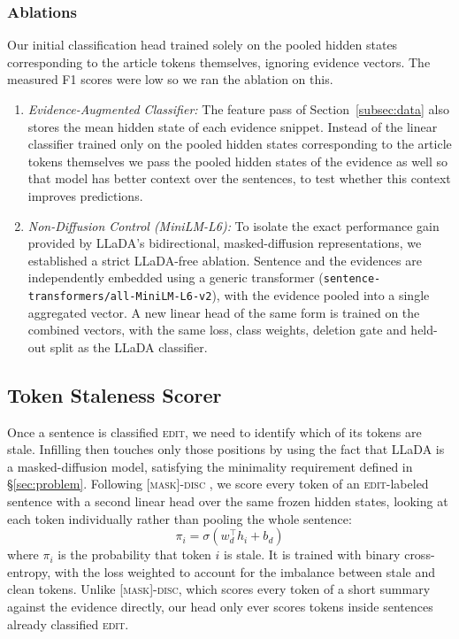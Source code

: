 \documentclass[11pt]{article}
\newcommand{\edit}{\textsc{edit}}
\newcommand{\maskdisc}{\textsc{[mask]-disc}}
\begin{document}
        \subsubsection{Ablations}
            Our initial classification head trained solely on the pooled hidden states corresponding to the article tokens themselves, ignoring evidence vectors. The measured F1 scores were low so we ran the ablation on this.
            \begin{enumerate}
                \item \emph{Evidence-Augmented Classifier:} The feature pass of Section~\ref{subsec:data} also stores the mean hidden state of each evidence snippet. Instead of the linear classifier trained only on the pooled hidden states corresponding to the article tokens themselves we pass the pooled hidden states of the evidence as well so that model has better context over the sentences, to test whether this context improves predictions.

                \item \emph{Non-Diffusion Control (MiniLM-L6):} To isolate the exact performance gain provided by LLaDA's bidirectional, masked-diffusion representations, we established a strict LLaDA-free ablation. Sentence and the evidences are independently embedded using a generic transformer (\texttt{sentence-transformers/\allowbreak all-MiniLM-L6-v2}), with the evidence pooled into a single aggregated vector. A new linear head of the same form is trained on the combined vectors, with the same loss, class weights, deletion gate and held-out split as the LLaDA classifier.
                
            \end{enumerate}

    \subsection{Token Staleness Scorer}
    \label{subsec:staleness}
    
    Once a sentence is classified \edit{}, we need to identify which of its
    tokens are stale. Infilling then touches only those positions by using the fact that LLaDA is a masked-diffusion model, satisfying
    the minimality requirement defined in \S\ref{sec:problem}.
    Following \maskdisc{} \citep{zou-etal-2026-detect}, we score every token of
    an \edit{}-labeled sentence with a second linear head over the same frozen
    hidden states, looking at each token individually rather than pooling the
    whole sentence:
    \begin{equation}
        \pi_i = \sigma\!\left(w_d^\top h_i + b_d\right)
        \label{eq:staleness}
    \end{equation}
    where $\pi_i$ is the probability that token $i$ is stale. It is trained
    with binary cross-entropy, with the loss weighted to account for the
    imbalance between stale and clean tokens. Unlike \maskdisc{}, which scores
    every token of a short summary against the evidence directly, our head
    only ever scores tokens inside sentences already classified \edit{}.
    
\end{document}
